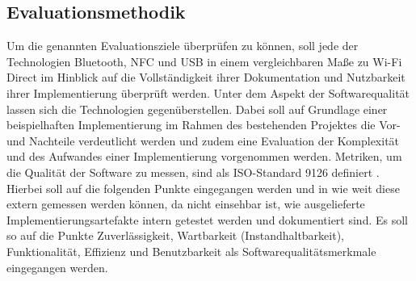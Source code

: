     \subsection{Evaluationsmethodik}
    	Um die genannten Evaluationsziele überprüfen zu können, soll jede der Technologien Bluetooth, NFC und USB in einem vergleichbaren Maße zu Wi-Fi Direct im Hinblick auf die Vollständigkeit ihrer Dokumentation und Nutzbarkeit ihrer Implementierung überprüft werden.
    	Unter dem Aspekt der Softwarequalität lassen sich die Technologien gegenüberstellen. Dabei soll auf Grundlage einer beispielhaften Implementierung im Rahmen des bestehenden Projektes die Vor- und Nachteile verdeutlicht werden und zudem eine Evaluation der Komplexität und des Aufwandes einer Implementierung vorgenommen werden. Metriken, um die Qualität der Software zu messen, sind als ISO-Standard 9126 definiert \cite[S.6]{liggesmeyer}. Hierbei soll auf die folgenden Punkte eingegangen werden und in wie weit diese extern gemessen werden können, da nicht einsehbar ist, wie ausgelieferte Implementierungsartefakte intern getestet werden und dokumentiert sind. Es soll so auf die Punkte Zuverlässigkeit, Wartbarkeit (Instandhaltbarkeit), Funktionalität, Effizienz und Benutzbarkeit als Softwarequalitätsmerkmale eingegangen werden.
